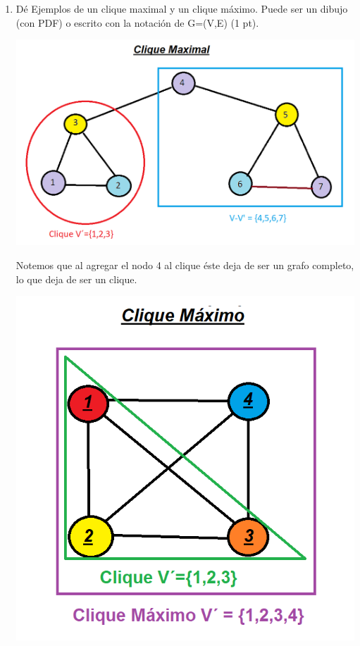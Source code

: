 \documentclass[a4paper,12pt]{article}
\begin{document}
\begin{enumerate}

\item Dé Ejemplos de un clique maximal y un clique máximo. Puede ser un dibujo (con PDF) o escrito con la notación de G=(V,E) (1 pt).

\begin{center}
\par \includegraphics[scale=0.7]{p1} \par
\end{center} 

Notemos que al agregar el nodo 4 al clique éste deja de ser un grafo completo, lo que deja de ser un clique.

\begin{center}
\par \includegraphics[scale=0.7]{p2} \par
\end{center} 


\end{enumerate}
\end{document}
